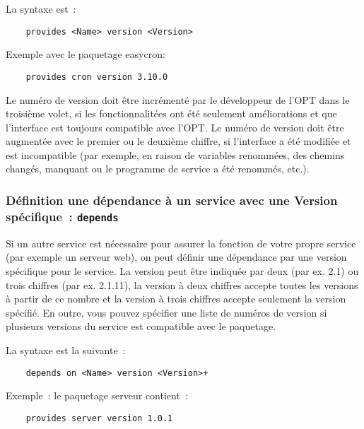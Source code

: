     La syntaxe est~:

\begin{example}
\begin{verbatim}
    provides <Name> version <Version>
\end{verbatim}
\end{example}

    Exemple avec le paquetage \og{}easycron\fg{}:

\begin{example}
\begin{verbatim}
    provides cron version 3.10.0
\end{verbatim}
\end{example}

    Le numéro de version doit être incrémenté par le développeur de l'OPT dans le troisième
	volet, si les fonctionnalitées ont été seulement améliorations et que l'interface est
	toujours compatible avec l'OPT. Le numéro de version doit être augmentée avec le premier
	ou le deuxième chiffre, si l'interface a été modifiée et est incompatible (par exemple,
	en raison de variables renommées, des chemins changés, manquant ou le programme de service
	a été renommés, etc.).


\subsubsection{Définition une dépendance à un service avec une
    Version spécifique~: \texttt{depends}}

	Si un autre service est nécessaire pour assurer la fonction de votre propre service
	(par exemple un serveur web), on peut définir une dépendance par une version spécifique
	pour le service. La version peut être indiquée par deux (par ex. \og{}2.1\fg{}) ou trois
	chiffres (par ex. \og{}2.1.11\fg{}), la version à deux chiffres accepte toutes les versions
	à partir de ce nombre et la version à trois chiffres accepte seulement la version spécifié.
	En outre, vous pouvez spécifier une liste de numéros de version si plusieurs versions
	du service est compatible avec le paquetage.

    La syntaxe est la suivante~:

\begin{example}
\begin{verbatim}
    depends on <Name> version <Version>+
\end{verbatim}
\end{example}

    Exemple~: le paquetage \og{}serveur\fg{} contient~:
\begin{example}
\begin{verbatim}
    provides server version 1.0.1
\end{verbatim}
\end{example}

